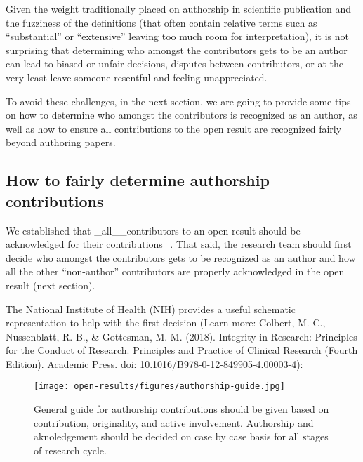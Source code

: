 \documentclass[
  letterpaper,
  DIV=11,
  numbers=noendperiod]{scrreport}
\begin{document}
Given the weight traditionally placed on authorship in scientific
publication and the fuzziness of the definitions (that often contain
relative terms such as ``substantial'' or ``extensive'' leaving too much
room for interpretation), it is not surprising that determining who
amongst the contributors gets to be an author can lead to biased or
unfair decisions, disputes between contributors, or at the very least
leave someone resentful and feeling unappreciated.

To avoid these challenges, in the next section, we are going to provide
some tips on how to determine who amongst the contributors is recognized
as an author, as well as how to ensure all contributions to the open
result are recognized fairly beyond authoring papers.

\hypertarget{how-to-fairly-determine-authorship-contributions}{%
\subsection{How to fairly determine authorship
contributions}\label{how-to-fairly-determine-authorship-contributions}}

We established that \_all\_\_contributors to an open result should be
acknowledged for their contributions\_. That said, the research team
should first decide who amongst the contributors gets to be recognized
as an author and how all the other ``non-author'' contributors are
properly acknowledged in the open result (next section).

The National Institute of Health (NIH) provides a useful schematic
representation to help with the first decision (Learn more: Colbert, M.
C., Nussenblatt, R. B., \& Gottesman, M. M. (2018). Integrity in
Research: Principles for the Conduct of Research. Principles and
Practice of Clinical Research (Fourth Edition). Academic Press. doi:
\href{https://www.sciencedirect.com/science/article/pii/B9780128499054000034?via\%3Dihub}{10.1016/B978-0-12-849905-4.00003-4}):

\begin{figure}

{\centering \texttt{[image: open-results/figures/authorship-guide.jpg]}

}

\caption{General guide for authorship contributions should be given
based on contribution, originality, and active involvement. Authorship
and aknoledgement should be decided on case by case basis for all stages
of research cycle.}

\end{figure}
\end{document}

